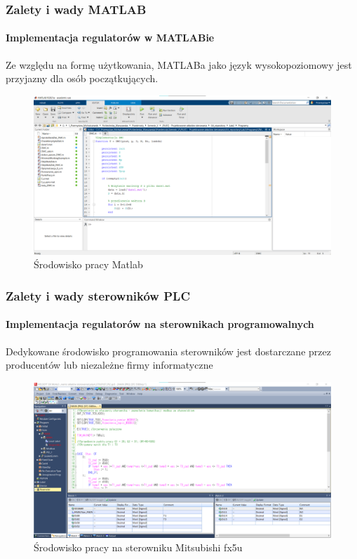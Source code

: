 \documentclass[aspectratio=169]{beamer}
\begin{document}
\begin{frame}
\frametitle{Zalety i wady MATLAB}
\framesubtitle{Implementacja regulatorów w MATLABie}
Ze względu na formę użytkowania, MATLABa jako język wysokopoziomowy jest przyjazny dla osób początkujących.

\begin{figure}
	\includegraphics[width=0.65\linewidth]{Rysunki/matlab_widok.png}
	\caption {Środowisko pracy Matlab}
\end{figure}
             


\end{frame}
\begin{frame}
\frametitle{Zalety i wady sterowników PLC}
\framesubtitle{Implementacja regulatorów na sterownikach programowalnych}
Dedykowane środowisko programowania sterowników jest dostarczane przez producentów lub niezależne firmy informatyczne

\begin{figure}
	\includegraphics[width=0.65\linewidth]{Rysunki/gtx_widok.png}
	\caption {Środowisko pracy na sterowniku Mitsubishi fx5u}
\end{figure}
             
\end{frame}
\end{document}
